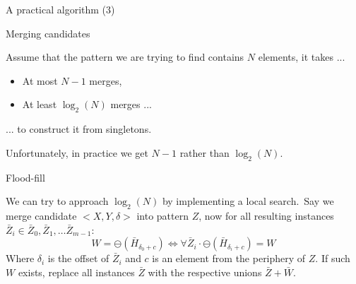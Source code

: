 \documentclass[11pt]{beamer}
\begin{document}
\begin{frame}{A practical algorithm (3)}

\end{frame}


\begin{frame}{Merging candidates}

Assume that the pattern we are trying to find contains $N$ elements, it takes ...
\begin{itemize}
\item At most $N-1$ merges,
\item At least $\log_2(N)$ merges ...
\end{itemize}
... to construct it from singletons.\medskip

Unfortunately, in practice we get $N-1$ rather than $\log_2(N)$.
\end{frame}


\begin{frame}{Flood-fill}

We can try to approach $\log_2(N)$ by implementing a local search.\
Say we merge candidate $<X,Y,\delta>$ into pattern $Z$, now for all resulting instances $\bar{Z}_i \in \bar{Z}_0,\bar{Z}_1,\dots\bar{Z}_{m-1}$:
$$
W = \ominus(\bar{H}_{\delta_0 + c}) \iff \forall \bar{Z}_i \cdot \ominus(\bar{H}_{\delta_i + c}) = W
$$
Where $\delta_i$ is the offset of $\bar{Z}_i$ and $c$ is an element from the periphery of $Z$. If such $W$ exists, replace all instances $\bar{Z}$ with the respective unions $\bar{Z}+\bar{W}$.
\end{frame}

\end{document}
